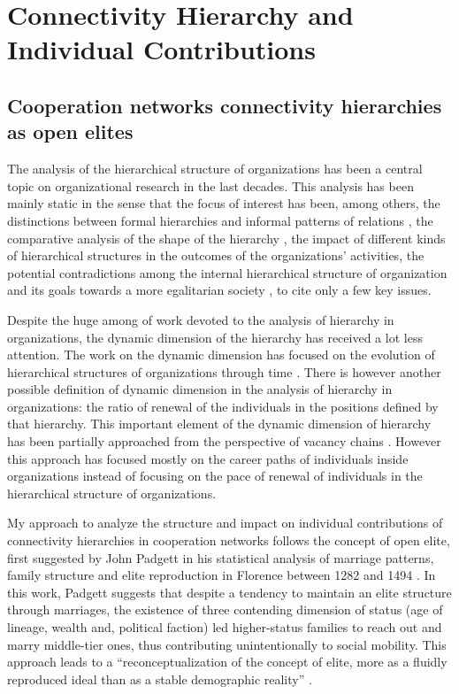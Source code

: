 \chapter{Connectivity Hierarchy and Individual Contributions}
\label{contributions}

\section{Cooperation networks connectivity hierarchies as open elites}

The analysis of the hierarchical structure of organizations has been a central topic on organizational research in the last decades. This analysis has been mainly static in the sense that the focus of interest has been, among others, the distinctions between formal hierarchies and informal patterns of relations \citep{krackhardt:1993, mcfarland:2001}, the comparative analysis of the shape of the hierarchy \citep{blau:1962,blau:1964}, the impact of different kinds of hierarchical structures in the outcomes of the organizations' activities, the potential contradictions among the internal hierarchical structure of organization and its goals towards a more egalitarian society \citep{michels:1915,selznick:1949}, to cite only a few key issues.

Despite the huge among of work devoted to the analysis of hierarchy in organizations, the dynamic dimension of the hierarchy has received a lot less attention. The work on the dynamic dimension has focused on the evolution of hierarchical structures of organizations through time \citep{blau:1969}. There is however another possible definition of dynamic dimension in the analysis of hierarchy in organizations: the ratio of renewal of the individuals in the positions defined by that hierarchy. This important element of the dynamic dimension of hierarchy has been partially approached from the perspective of vacancy chains \citep{white:1970,stewman:1983}. However this approach has focused mostly on the career paths of individuals inside organizations instead of focusing on the pace of renewal of individuals in the hierarchical structure of organizations.

My approach to analyze the structure and impact on individual contributions of connectivity hierarchies in cooperation networks follows the concept of open elite, first suggested by John Padgett in his statistical analysis of marriage patterns, family structure and elite reproduction in Florence between 1282 and 1494 \citep{padgett:2010}. In this work, Padgett suggests that despite a tendency to maintain an elite structure through marriages, the existence of three contending dimension of status (age of lineage, wealth and, political faction) led higher-status families to reach out and marry middle-tier ones, thus contributing unintentionally to social mobility. This approach leads to a ``reconceptualization of the concept of elite, more as a fluidly reproduced ideal than as a stable demographic reality'' \citep[360]{padgett:2010}. 

